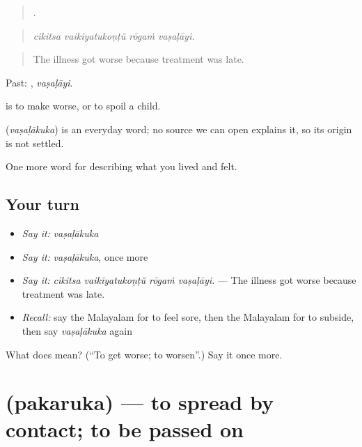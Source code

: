 \begin{quote}
   .
\end{quote}

\begin{quote}
\emph{cikitsa vaikiyatukoṇṭŭ rōgaṁ vaṣaḷāyi.}
\end{quote}

\begin{quote}
The illness got worse because treatment was late.
\end{quote}

Past: , \emph{vaṣaḷāyi}.

 is to make worse, or to spoil a child.

\begin{cousinweb}
\textbf{} (\emph{vaṣaḷākuka}) is an everyday word; no source we can open explains it, so its origin is not settled.
\end{cousinweb}

\begin{grammarlens}[title={What you've built}]
One more word for describing what you lived and felt.
\end{grammarlens}

\subsection*{Your turn}
\begin{itemize}
\raggedright
  \item \emph{Say it:} \emph{vaṣaḷākuka}
  \item \emph{Say it:} \emph{vaṣaḷākuka}, once more
  \item \emph{Say it:} \emph{cikitsa vaikiyatukoṇṭŭ rōgaṁ vaṣaḷāyi.} — The illness got worse because treatment was late.
  \item \emph{Recall:} say the Malayalam for to feel sore, then the Malayalam for to subside, then say \emph{vaṣaḷākuka} again
\end{itemize}

\begin{tcolorbox}[breakable,colback=teal!4,colframe=teal!35!black,title={Before you move on}]
What does  mean? (\textquotedblleft{}To get worse; to worsen\textquotedblright{}.) Say it once more.
\end{tcolorbox}
\section[\texorpdfstring{\ml{പകരുക} (pakaruka)}{പകരുക (pakaruka)}]{ (pakaruka) — to spread by contact; to be passed on}

